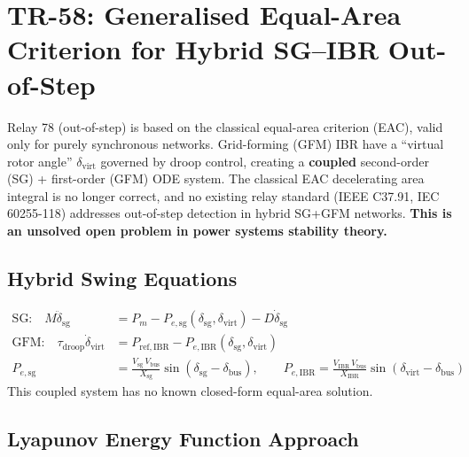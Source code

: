 \documentclass[12pt, a4paper]{report}
\begin{document}
\section{TR-58: Generalised Equal-Area Criterion for Hybrid SG--IBR Out-of-Step}

\begin{tcolorbox}[gapbox, title={Research Gap — TR-58}]
Relay 78 (out-of-step) is based on the classical equal-area criterion (EAC), valid only for purely synchronous networks. Grid-forming (GFM) IBR have a ``virtual rotor angle'' $\delta_\mathrm{virt}$ governed by droop control, creating a \textbf{coupled} second-order (SG) + first-order (GFM) ODE system. The classical EAC decelerating area integral is no longer correct, and no existing relay standard (IEEE C37.91, IEC 60255-118) addresses out-of-step detection in hybrid SG+GFM networks. \textbf{This is an unsolved open problem in power systems stability theory.}
\end{tcolorbox}

\subsection{Hybrid Swing Equations}

\begin{tcolorbox}[mathbox]
\begin{align}
  \text{SG:} \quad M\ddot{\delta}_\mathrm{sg} &= P_m - P_{e,\mathrm{sg}}(\delta_\mathrm{sg}, \delta_\mathrm{virt}) - D\dot{\delta}_\mathrm{sg} \\[4pt]
  \text{GFM:} \quad \tau_\mathrm{droop}\dot{\delta}_\mathrm{virt} &= P_\mathrm{ref,IBR} - P_{e,\mathrm{IBR}}(\delta_\mathrm{sg}, \delta_\mathrm{virt}) \\[8pt]
  P_{e,\mathrm{sg}} &= \frac{V_\mathrm{sg}\,V_\mathrm{bus}}{X_\mathrm{sg}}\sin(\delta_\mathrm{sg} - \delta_\mathrm{bus}), \qquad
  P_{e,\mathrm{IBR}} = \frac{V_\mathrm{IBR}\,V_\mathrm{bus}}{X_\mathrm{IBR}}\sin(\delta_\mathrm{virt} - \delta_\mathrm{bus})
\end{align}
This coupled system has no known closed-form equal-area solution.
\end{tcolorbox}

\subsection{Lyapunov Energy Function Approach}
\end{document}
